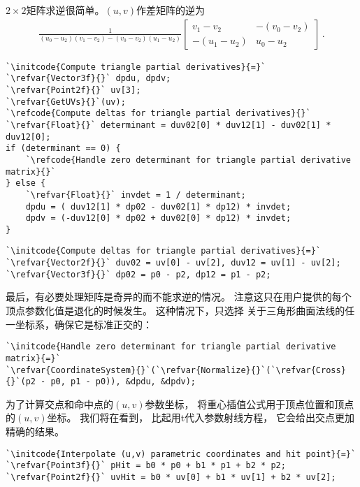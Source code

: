 $2\times2$矩阵求逆很简单。$(u,v)$作差矩阵的逆为
\begin{align*}
    \frac{1}{(u_0-u_2)(v_1-v_2)-(v_0-v_2)(u_1-u_2)}\left[\begin{array}{cc}
            v_1-v_2    & -(v_0-v_2) \\
            -(u_1-u_2) & u_0-u_2
        \end{array}\right]\, .
\end{align*}
\begin{lstlisting}
`\initcode{Compute triangle partial derivatives}{=}`
`\refvar{Vector3f}{}` dpdu, dpdv;
`\refvar{Point2f}{}` uv[3];
`\refvar{GetUVs}{}`(uv);
`\refcode{Compute deltas for triangle partial derivatives}{}`
`\refvar{Float}{}` determinant = duv02[0] * duv12[1] - duv02[1] * duv12[0];
if (determinant == 0) {
    `\refcode{Handle zero determinant for triangle partial derivative matrix}{}`
} else {
    `\refvar{Float}{}` invdet = 1 / determinant;
    dpdu = ( duv12[1] * dp02 - duv02[1] * dp12) * invdet;
    dpdv = (-duv12[0] * dp02 + duv02[0] * dp12) * invdet;
}
\end{lstlisting}
\begin{lstlisting}
`\initcode{Compute deltas for triangle partial derivatives}{=}`
`\refvar{Vector2f}{}` duv02 = uv[0] - uv[2], duv12 = uv[1] - uv[2];
`\refvar{Vector3f}{}` dp02 = p0 - p2, dp12 = p1 - p2;
\end{lstlisting}

最后，有必要处理矩阵是奇异的而不能求逆的情况。
注意这只在用户提供的每个顶点参数化值是退化的时候发生。
这种情况下，只选择
关于三角形曲面法线的任一坐标系，确保它是标准正交的：
\begin{lstlisting}
`\initcode{Handle zero determinant for triangle partial derivative matrix}{=}`
`\refvar{CoordinateSystem}{}`(`\refvar{Normalize}{}`(`\refvar{Cross}{}`(p2 - p0, p1 - p0)), &dpdu, &dpdv);
\end{lstlisting}

为了计算交点和命中点的$(u,v)$参数坐标，
将重心插值公式用于顶点位置和顶点的$(u,v)$坐标。
我们将在看到，
比起用{\ttfamily t}代入参数射线方程，
它会给出交点更加精确的结果。
\begin{lstlisting}
`\initcode{Interpolate (u,v) parametric coordinates and hit point}{=}`
`\refvar{Point3f}{}` pHit = b0 * p0 + b1 * p1 + b2 * p2;
`\refvar{Point2f}{}` uvHit = b0 * uv[0] + b1 * uv[1] + b2 * uv[2];
\end{lstlisting}

